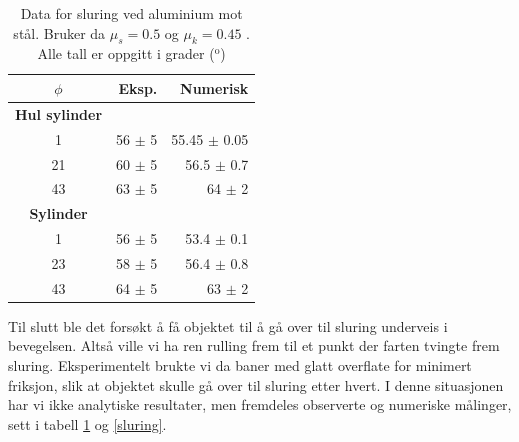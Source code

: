 \documentclass[5p]{elsarticle}
\begin{document}
	\begin{table}[H]
	    \begin{center}
	        \caption{Data for sluring ved aluminium mot stål. Bruker da $\mu _s = 0.5$ og $\mu _k = 0.45$ \cite{Haugan}. Alle tall er oppgitt i grader ($^{\text{o}}$)}
	        \label{metall2}
	        \begin{tabular}{|crr|}
	            \hline
				$\phi$  &  Eksp. & Numerisk  \\
				\hline \hline
				\textbf{Hul sylinder} & &  \\
				1   &  56 $\pm$ 5  &  55.45 $\pm$ 0.05   \\
				21  &  60 $\pm$ 5  &  56.5 $\pm$ 0.7   \\
				43  &  63 $\pm$ 5  &  64 $\pm$ 2    \\
				\hline \hline
				\textbf{Sylinder} & &  \\
				1   &  56 $\pm$ 5  &  53.4 $\pm$ 0.1   \\
				23  &  58 $\pm$ 5  &  56.4 $\pm$ 0.8   \\
				43  &  64 $\pm$ 5  &  63 $\pm$ 2   \\
				\hline
	        \end{tabular}
	    \end{center}
	\end{table}
	
	
	Til slutt ble det forsøkt å få objektet til å gå over til sluring underveis i bevegelsen. Altså ville vi ha ren rulling frem til et punkt der farten tvingte frem sluring. Eksperimentelt brukte vi da baner med glatt overflate for minimert friksjon, slik at objektet skulle gå over til sluring etter hvert. I denne situasjonen har vi ikke analytiske resultater, men fremdeles observerte og numeriske målinger, sett i tabell \ref{metall2} og \ref{sluring}.
	
\end{document}
